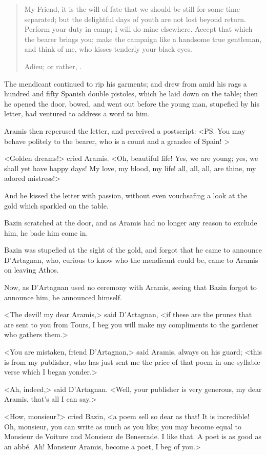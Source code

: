 \begin{quotation}
	My Friend, it is the will of fate that we should be still for some time separated; but the delightful days of youth are not lost beyond return. Perform your duty in camp; I will do mine elsewhere. Accept that which the bearer brings you; make the campaign like a handsome true gentleman, and think of me, who kisses tenderly your black eyes.
	
	Adieu; or rather, .
\end{quotation}

The mendicant continued to rip his garments; and drew from amid his rags a hundred and fifty Spanish double pistoles, which he laid down on the table; then he opened the door, bowed, and went out before the young man, stupefied by his letter, had ventured to address a word to him. 

Aramis then reperused the letter, and perceived a postscript: <PS. You may behave politely to the bearer, who is a count and a grandee of Spain! >

<Golden dreams!> cried Aramis. <Oh, beautiful life! Yes, we are young; yes, we shall yet have happy days! My love, my blood, my life! all, all, all, are thine, my adored mistress!> 

And he kissed the letter with passion, without even vouchsafing a look at the gold which sparkled on the table. 

Bazin scratched at the door, and as Aramis had no longer any reason to exclude him, he bade him come in. 

Bazin was stupefied at the sight of the gold, and forgot that he came to announce D'Artagnan, who, curious to know who the mendicant could be, came to Aramis on leaving Athos. 

Now, as D'Artagnan used no ceremony with Aramis, seeing that Bazin forgot to announce him, he announced himself. 

<The devil! my dear Aramis,> said D'Artagnan, <if these are the prunes that are sent to you from Tours, I beg you will make my compliments to the gardener who gathers them.> 

<You are mistaken, friend D'Artagnan,> said Aramis, always on his guard; <this is from my publisher, who has just sent me the price of that poem in one-syllable verse which I began yonder.> 

<Ah, indeed,> said D'Artagnan. <Well, your publisher is very generous, my dear Aramis, that's all I can say.> 

<How, monsieur?> cried Bazin, <a poem sell so dear as that! It is incredible! Oh, monsieur, you can write as much as you like; you may become equal to Monsieur de Voiture and Monsieur de Benserade. I like that. A poet is as good as an abbé. Ah! Monsieur Aramis, become a poet, I beg of you.> 

